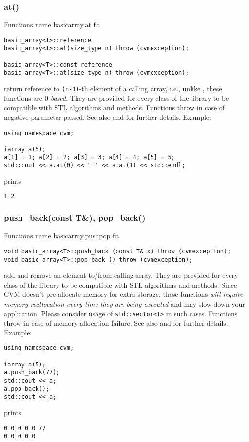 \subsubsection{at()}
Functions%
\pdfdest name {basicarray.at} fit
\begin{verbatim}
basic_array<T>::reference
basic_array<T>::at(size_type n) throw (cvmexception);

basic_array<T>::const_reference 
basic_array<T>::at(size_type n) throw (cvmexception);
\end{verbatim}
return  reference to  \verb"(n-1)"-th element of a calling array, i.e.,
unlike ,
these functions are \emph{$0$-based}.
They are provided for every class of the library to be compatible 
with STL algorithms and methods. 
Functions throw  
in case of negative parameter passed.
See also 
and 
for further details.
Example:
\begin{Verbatim}
using namespace cvm;

iarray a(5);
a[1] = 1; a[2] = 2; a[3] = 3; a[4] = 4; a[5] = 5;
std::cout << a.at(0) << " " << a.at(1) << std::endl;
\end{Verbatim}
prints
\begin{Verbatim}
1 2
\end{Verbatim}
\newpage


\subsubsection{push\_back(const T\&), pop\_back()}
Functions%
\pdfdest name {basicarray.pushpop} fit
\begin{verbatim}
void basic_array<T>::push_back (const T& x) throw (cvmexception);
void basic_array<T>::pop_back () throw (cvmexception);
\end{verbatim}
add and remove an element to/from calling array.
They are provided for every class of the library to be compatible 
with STL algorithms and methods. Since CVM doesn't 
pre-allocate  memory for extra storage, these functions
\emph{will require memory reallocation every time they are being executed}
and may slow down your application. Please consider usage of
\verb"std::vector<T>" in such cases.
Functions throw  
in case of memory allocation failure.
See also 
and 
for further details.
Example:
\begin{Verbatim}
using namespace cvm;

iarray a(5);
a.push_back(77);
std::cout << a;
a.pop_back();
std::cout << a;
\end{Verbatim}
prints
\begin{Verbatim}
0 0 0 0 0 77
0 0 0 0 0
\end{Verbatim}
\newpage


